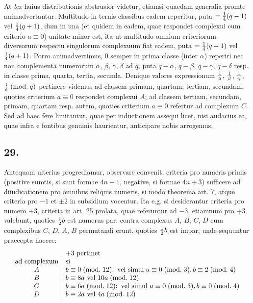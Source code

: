 \documentclass[twoside,12pt]{memoir}
\renewcommand{\pmod}[1]{\;(\textrm{mod.}\;#1)}
\let\oldfrac\frac
\def\frac#1#2{\mathchoice{\tfrac{#1}{#2}}{\oldfrac{#1}{#2}}{\genfrac{}{}{}{2}{#1}{#2\mathstrut}}{\genfrac{}{}{}{3}{#1}{#2\mathstrut}}}
\begin{document}
At \textit{lex} huius distributionis abstrusior videtur, etiamsi quaedam generalia promte animadvertantur. Multitudo in ternis classibus eadem reperitur, puta \(=\frac{1}{4}(q-1)\) vel \(\frac{1}{4}(q+1)\), dum in una (et quidem in eadem, quae respondet complexui cum criterio \(a \equiv 0\)) unitate minor est, ita ut multitudo omnium criteriorum diversorum respectu singulorum complexuum fiat eadem, puta \(=\frac{1}{4}(q-1)\) vel \(\frac{1}{4}(q+1)\). Porro animadvertimus, \(0\) semper in prima classe (inter \(\alpha\)) reperiri nec non complementa numerorum \(\alpha\), \(\beta\), \(\gamma\), \(\delta\) ad \(q\), puta \(q-\alpha\), \(q-\beta\), \(q-\gamma\), \(q-\delta\) resp. in classe prima, quarta, tertia, secunda. Denique valores expressionum \(\frac{1}{a}\), \(\frac{1}{\beta}\), \(\frac{1}{\gamma}\), \(\frac{1}{\delta} \pmod{q}\) pertinere videmus ad classem primam, quartam, tertiam, secundam, quoties criterium \(a \equiv 0\) respondet complexui \(A\); ad classem tertiam, secundam, primam, quartam resp. autem, quoties criterium \(a \equiv 0\) refertur ad complexum \(C\). Sed ad haec fere limitantur, quae per inductionem assequi licet, nisi audacius ea, quae infra e fontibus genuinis haurientur, anticipare nobis arrogemus.

\subsection*{29.}
 
Antequam ulterius progrediamur, observare convenit, criteria pro numeris primis (positive sumtis, si sunt formae \(4 n+1\), negative, si formae \(4 n+3\)) sufficere ad diiudicationem pro omnibus reliquis numeris, si modo theorema art. 7, atque criteria pro \(-1\) et \(\pm 2\) in subsidium vocentur. Ita e.g. si desiderantur criteria pro numero \(+3\), criteria in art. 25 prolata, quae referuntur ad \(-3\), etiamnum pro \(+3\) valebunt, quoties \(\frac{1}{2} b\) est numerus par: contra complexus \(A\), \(B\), \(C\), \(D\) cum complexibus \(C\), \(D\), \(A\), \(B\) permutandi erunt, quoties \(\frac{1}{2} b\) est impar, unde sequuntur praecepta haecce:\pagebreak%
\[\begin{array}{c|l}
\multicolumn{1}{c}{}&\multicolumn{1}{l}{+3\text{ pertinet}}\\
\text{ad complexum}&\text{si}\\
A & b \equiv 0\pmod{12}; \text{ vel simul } a \equiv 0\pmod{3}, b \equiv 2\pmod{4} \\
B & b \equiv 8 a \text{ vel } 10 a\pmod{12} \\
C & b \equiv 6 a\pmod{12}; \text{ vel simul } a \equiv 0\pmod{3}, b \equiv 0\pmod{4} \\
D & b \equiv 2 a \text{ vel } 4 a\pmod{12}
\end{array}\]
\end{document}
